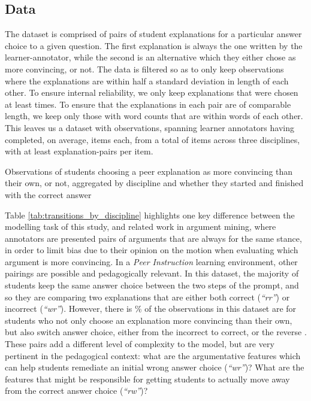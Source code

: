 \documentclass[runningheads]{llncs}
\begin{document}
\subsection{Data}
The dataset is comprised of pairs of student explanations for a particular 
answer choice to a given question. The first explanation is always the one 
written by the learner-annotator, while the second is an alternative which 
they either chose as more convincing, or not. The data is filtered so as 
to only keep observations where the explanations are within half a standard 
deviation in length of each other. To ensure internal reliability, we only keep 
explanations that were chosen at least times. To ensure 
that the explanations in each pair 
are of comparable length, we keep only those with word counts that are within  
words of each other. This leaves us a dataset 
with observations, spanning learner 
annotators having completed, on average, items 
each, from a total of items across three disciplines, 
with at least explanation-pairs per item.
\begin{table}
\caption{Observations of students choosing a peer explanation as 
more 
	convincing than their own, or not, aggregated by discipline and whether 
	they 
	started and finished with the correct answer}



\label{tab:transitions_by_discipline}
\end{table}

Table \ref{tab:transitions_by_discipline} highlights one key difference between 
the modelling task of this study, and related work in argument mining, where 
annotators are presented pairs of arguments that are always for the same 
stance, in order to limit bias due to their opinion on the motion when 
evaluating which argument is more convincing.
In a \textit{Peer Instruction} learning environment, other pairings are 
possible and pedagogically relevant. In this dataset, the majority of students 
keep the same answer choice between the two steps of the prompt, and so they 
are comparing two explanations that are either both correct (\textit{``rr''}) 
or incorrect (\textit{``wr''}). However, there is 
\% of the observations in this dataset are for students 
who not only choose an explanation more convincing than their own, but also 
switch answer choice, 
either from the incorrect to correct, or the reverse . These pairs add a 
different level of complexity to the model, but are very pertinent in the 
pedagogical context: what are the argumentative features which can help 
students remediate an initial wrong answer choice (\textit{``wr''})? What are 
the features that might be responsible for getting students to actually move 
away from the correct answer choice (\textit{``rw''})?
\end{document}
